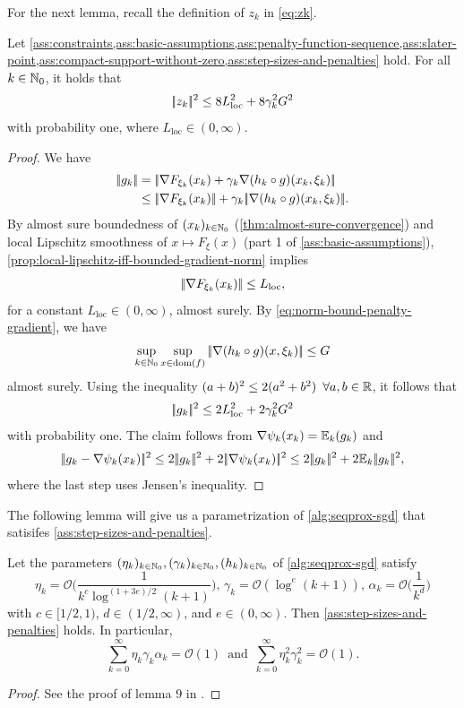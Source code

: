 For the next lemma, recall the definition of $z_k$ in \eqref{eq:zk}.
\begin{lemma}
    \label{lem:bound-on-norm(zk)}
    Let \cref{ass:constraints,ass:basic-assumptions,ass:penalty-function-sequence,ass:slater-point,ass:compact-support-without-zero,ass:step-sizes-and-penalties} hold.
    For all $k\in\mathbb{N}_0$, it holds that
    \[
        |\!|z_k|\!|^2 \leq 8L_{\text{loc}}^2 + 8\gamma_k^2G^2
    \]
    with probability one, where $L_{\text{loc}} \in (0,\infty)$.
\end{lemma}
\begin{proof}
    We have
    \begin{align*}
        \norm{g_k} &= \norm{\nabla F_{\xi_k}(x_k) + \gamma_k \nabla (h_k \circ g)(x_k, \xi_k)} \\
                &\leq \norm{\nabla F_{\xi_k}(x_k)} + \gamma_k \norm{\nabla (h_k \circ g)(x_k, \xi_k)}.
    \end{align*}
    By almost sure boundedness of $(x_k)_{k\in\mathbb{N}_0}$ (\cref{thm:almost-sure-convergence}) and
    local Lipschitz smoothness of $x\mapsto F_{\xi}(x)$ (part 1 of \cref{ass:basic-assumptions}),
    \cref{prop:local-lipschitz-iff-bounded-gradient-norm} implies
    \[
        |\!|\nabla F_{\xi_k}(x_k)|\!| \leq L_\text{loc},
    \]
    for a constant $L_\text{loc}\in(0,\infty)$,
    almost surely.
    By \eqref{eq:norm-bound-penalty-gradient}, we have
    \[
        \sup_{k\in\mathbb{N}_0}\sup_{x\in\operatorname{dom}(f)} |\!|\nabla (h_k \circ g)(x, \xi_k)|\!| \leq G
    \]
    almost surely.
    Using the inequality $(a + b)^2 \leq 2 (a^2 + b^2) \enspace \forall a,b\in\mathbb{R}$, it follows that
    \[
        |\!|g_k|\!|^2 \leq 2L^2_\text{loc} + 2\gamma_k^2G^2
    \]
    with probability one.
    The claim follows from $\nabla \psi_k(x_k) = \mathbb{E}_k(g_k)$ and
    \[
        \norm{g_k - \nabla \psi_k(x_k)}^2
        \leq 2\norm{g_k}^2 + 2\norm{\nabla \psi_k(x_k)}^2
        \leq 2\norm{g_k}^2 + 2\E_k\norm{g_k}^2,
    \]
    where the last step uses Jensen's inequality.
\end{proof}

The following lemma will give us a parametrization of \cref{alg:seqprox-sgd} that satisifes \cref{ass:step-sizes-and-penalties}.
\begin{lemma}
    \label{lem:parameters-for-convex-case}
    Let the parameters $(\eta_k)_{k\in\mathbb{N}_0}, (\gamma_k)_{k\in\mathbb{N}_0}, (h_k)_{k\in\mathbb{N}_0}$
    of \cref{alg:seqprox-sgd} satisfy
    \[
        \eta_k = \mathcal{O}\Big( \frac{1}{k^c \log^{(1 + 3e) / 2}(k+1)} \Big),\,
        \gamma_k = \mathcal{O}(\log^{e}(k+1)),\,
        \alpha_k = \mathcal{O}\Big( \frac{1}{k^d} \Big)
    \]
    with $c\in[1/2, 1)$, $d \in (1/2, \infty)$, and $e \in (0,\infty)$.
    Then \cref{ass:step-sizes-and-penalties} holds. In particular,
    \[
        \sum_{k=0}^\infty \eta_k\gamma_k\alpha_k = \mathcal{O}(1) \enspace\text{and}\enspace
        \sum_{k=0}^\infty \eta_k^2\gamma_k^2 = \mathcal{O}(1).
    \]
\end{lemma}
\begin{proof}
    See the proof of lemma 9 in \cite{nedich2023huber}.
\end{proof}


